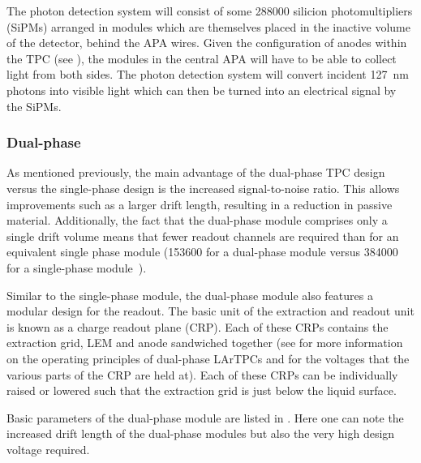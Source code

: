 The photon detection system will consist of some \num{288000} silicion photomultipliers (SiPMs) arranged in modules which are themselves placed in the inactive volume of the detector, behind the APA wires.
Given the configuration of anodes within the TPC (see ), the modules in the central APA will have to be able to collect light from both sides.
The photon detection system will convert incident \SI{127}{\nano\metre} photons into visible light which can then be turned into an electrical signal by the SiPMs.

\subsubsection{Dual-phase}
\label{sec:dune:fd:modules:dualphase}
As mentioned previously, the main advantage of the dual-phase TPC design versus the single-phase design is the increased signal-to-noise ratio.
This allows improvements such as a larger drift length, resulting in a reduction in passive material.
Additionally, the fact that the dual-phase module comprises only a single drift volume means that fewer readout channels are required than for an equivalent single phase module (\num{153600} for a dual-phase module versus \num{384000} for a single-phase module~\cite{idrVol3}).

Similar to the single-phase module, the dual-phase module also features a modular design for the readout.
The basic unit of the extraction and readout unit is known as a charge readout plane (CRP).
Each of these CRPs contains the extraction grid, LEM and anode sandwiched together (see  for more information on the operating principles of dual-phase LArTPCs and  for the voltages that the various parts of the CRP are held at).
Each of these CRPs can be individually raised or lowered such that the extraction grid is just below the liquid surface.

Basic parameters of the dual-phase module are listed in .
Here one can note the increased drift length of the dual-phase modules but also the very high design voltage required.

